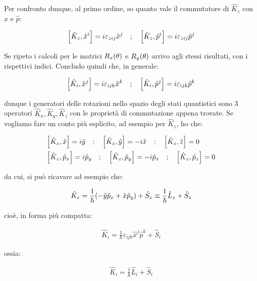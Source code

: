 	Per confronto dunque, al primo ordine, so quanto vale il commutatore di $\hat{K}_z$ con $\hat{x}$ e $\hat{p}$:
	
\begin{align*}
	\qty[\hat{K}_z, \hat{x}^i] = i \varepsilon_{zij} \hat{x}^j \quad ; \quad \qty[\hat{K}_z, \hat{p}^i] = i \varepsilon_{zij} \hat{p}^j
\end{align*}

	Se ripeto i calcoli per le matrici $R_x\qty(\theta)$ e $R_y\qty(\theta)$ arrivo agli stessi risultati, con i rispettivi indici. Concludo quindi che, in generale:
	
\begin{align*}
	\qty[\hat{K}_i, \hat{x}^j] = i \varepsilon_{ijk} \hat{x}^{k} \quad ; \quad \qty[\hat{K}_i, \hat{p}^j] = i \varepsilon_{ijk} \hat{p}^{k}
\end{align*}

	dunque i generatori delle rotazioni nello spazio degli stati quantistici sono $3$ operatori $\hat{K}_x, \hat{K}_y, \hat{K}_z$ con le proprietà di commutazione appena trovate. Se vogliamo fare un conto più esplicito, ad esempio per $\hat{K}_z$, ho che:
	
\begin{align*}
	& \qty[\hat{K}_z, \hat{x}] = i \hat{y} \quad ; \quad \qty[\hat{K}_z, \hat{y}] =  - i \hat{x} \quad ; \quad \qty[\hat{K}_z, \hat{z}] = 0  \\
	& \qty[\hat{K}_z, \hat{p}_x] = i \hat{p}_y \quad ; \quad \qty[\hat{K}_z, \hat{p}_y] =  - i \hat{p}_x \quad ; \quad \qty[\hat{K}_z, \hat{p}_z] = 0 
\end{align*}
	
	da cui, si può ricavare ad esempio che:
	
\begin{align*}
	\hat{K}_z = \frac{1}{\hbar} \qty( - \hat{y} \hat{p}_x + \hat{x} \hat{p}_y) + \hat{S}_z \equiv \frac{1}{\hbar} \hat{L}_z + \hat{S}_z
\end{align*}

	cioè, in forma più compatta:
	
\begin{align*}
	\hat{K}_i = \frac{1}{\hbar} \varepsilon_{ijk} \hat{x}^j \hat{p}^k + \hat{S}_i
\end{align*}

	ossia:
	
\begin{align*}
	\hat{K}_i = \frac{1}{\hbar} \hat{L}_i + \hat{S}_i
\end{align*}

